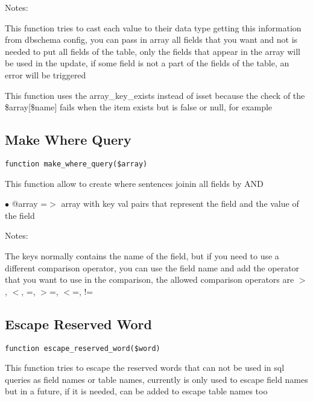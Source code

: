 \documentclass[a4paper]{book}
\begin{document}
Notes:

This function tries to cast each value to their data type getting this
information from dbschema config, you can pass in array all fields that
you want and not is needed to put all fields of the table, only the
fields that appear in the array will be used in the update, if some
field is not a part of the fields of the table, an error will be
triggered

This function uses the array\_key\_exists instead of isset because the
check of the \$array[\$name] fails when the item exists but is false or
null, for example

\hypertarget{toc264}{}
\subsection{Make Where Query}

\begin{lstlisting}
function make_where_query($array)
\end{lstlisting}

This function allow to create where sentences joinin all fields by AND

\begin{compactitem}
\item[\color{myblue}$\bullet$] @array =$>$ array with key val pairs that represent the field and the value of
          the field
\end{compactitem}

Notes:

The keys normally contains the name of the field, but if you need to use
a different comparison operator, you can use the field name and add the
operator that you want to use in the comparison, the allowed comparison
operators are $>$, $<$, =, $>$=, $<$=, !=

\hypertarget{toc265}{}
\subsection{Escape Reserved Word}

\begin{lstlisting}
function escape_reserved_word($word)
\end{lstlisting}

This function tries to escape the reserved words that can not be used
in sql queries as field names or table names, currently is only used
to escape field names but in a future, if it is needed, can be added
to escape table names too
\end{document}

